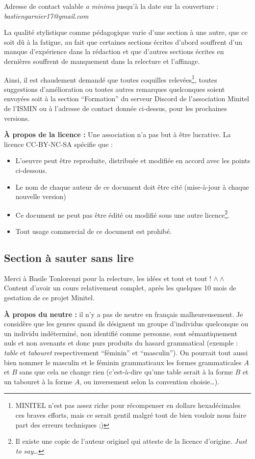 \documentclass[../main.tex]{subfiles}
\begin{document}
Adresse de contact valable \textit{a minima} jusqu'à la date sur la couverture : \textit{bastiengarnier17@gmail.com}

La qualité stylistique comme pédagogique varie d'une section à une autre, que ce soit dû à la fatigue, au fait que certaines sections écrites d'abord souffrent d'un manque d'expérience dans la rédaction et que d'autres sections écrites en dernières souffrent de manquement dans la relecture et l'affinage. 

Ainsi, il est chaudement demandé que toutes coquilles relevées\footnote{MINITEL n'est pas assez riche pour récompenser en dollars hexadécimales ces braves efforts, mais ce serait gentil malgré tout de bien vouloir nous faire part des erreurs techniques ;)}, toutes suggestions d'amélioration ou toutes autres remarques quelconques soient envoyées soit à la section ``Formation'' du serveur Discord de l'association Minitel de l'ISMIN ou à l'adresse de contact donnée ci-dessus, pour les prochaines versions.

\textbf{À propos de la licence :} Une association n'a pas but à être lucrative. La licence \textsc{CC-BY-NC-SA} spécifie que :
\begin{itemize}
	\item L'oeuvre peut être reproduite, distribuée et modifiée en accord avec les points ci-dessous.
	\item Le nom de chaque auteur de ce document doit être cité (mise-à-jour à chaque nouvelle version)
	\item Ce document ne peut pas être édité ou modifié sous une autre licence\footnote{Il existe une copie de l'auteur originel qui atteste de la licence d'origine. \textit{Just to say\dots}}.
	\item Tout usage commercial de ce document est prohibé.
\end{itemize}

\subsection*{Section à sauter sans lire}
Merci à Basile Tonlorenzi pour la relecture, les idées et tout et tout ! $\wedge\wedge$ Content d'avoir un cours relativement complet, après les quelques 10 mois de gestation de ce projet Minitel.

\textbf{À propos du neutre :} il n'y a pas de neutre en français malheureusement. Je considère que les genres quand ils désignent un groupe d'individus quelconque ou un individu indéterminé, non identifié comme personne, sont sémantiquement nuls et non avenants et donc purs produits du hasard grammatical (exemple : \textit{table} et \textit{tabouret} respectivement ``féminin'' et ``masculin''). On pourrait tout aussi bien nommer le masculin et le féminin grammaticaux les formes grammaticales $A$ et $B$ sans que cela ne change rien (c'est-à-dire qu'une table serait à la forme $B$ et un tabouret à la forme $A$, ou inversement selon la convention choisie\dots).
\end{document}
